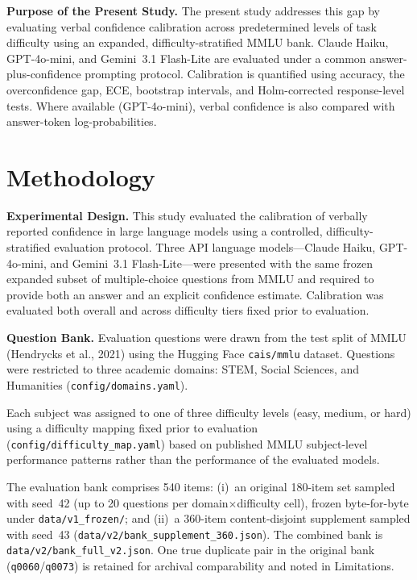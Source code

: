 \documentclass[twoside,twocolumn,10pt]{article}
\begin{document}
\textbf{Purpose of the Present Study.}
The present study addresses this gap by evaluating verbal confidence calibration across predetermined levels of task difficulty using an expanded, difficulty-stratified MMLU bank. Claude Haiku, GPT-4o-mini, and Gemini~3.1 Flash-Lite are evaluated under a common answer-plus-confidence prompting protocol. Calibration is quantified using accuracy, the overconfidence gap, ECE, bootstrap intervals, and Holm-corrected response-level tests. Where available (GPT-4o-mini), verbal confidence is also compared with answer-token log-probabilities.

\section{Methodology}

\fontsize{12}{14}\selectfont

\textbf{Experimental Design.}
This study evaluated the calibration of verbally reported confidence in large language models using a controlled, difficulty-stratified evaluation protocol. Three API language models---Claude Haiku, GPT-4o-mini, and Gemini~3.1 Flash-Lite---were presented with the same frozen expanded subset of multiple-choice questions from MMLU and required to provide both an answer and an explicit confidence estimate. Calibration was evaluated both overall and across difficulty tiers fixed prior to evaluation.

\textbf{Question Bank.}
Evaluation questions were drawn from the test split of MMLU (Hendrycks et al., 2021) using the Hugging Face \texttt{cais/mmlu} dataset. Questions were restricted to three academic domains: STEM, Social Sciences, and Humanities (\texttt{config/domains.yaml}).

Each subject was assigned to one of three difficulty levels (easy, medium, or hard) using a difficulty mapping fixed prior to evaluation (\texttt{config/difficulty\_map.yaml}) based on published MMLU subject-level performance patterns rather than the performance of the evaluated models.

The evaluation bank comprises 540 items: (i)~an original 180-item set sampled with seed~42 (up to 20 questions per domain$\times$difficulty cell), frozen byte-for-byte under \texttt{data/v1\_frozen/}; and (ii)~a 360-item content-disjoint supplement sampled with seed~43 (\texttt{data/v2/bank\_supplement\_360.json}). The combined bank is \texttt{data/v2/bank\_full\_v2.json}. One true duplicate pair in the original bank (\texttt{q0060}/\texttt{q0073}) is retained for archival comparability and noted in Limitations.
\end{document}
